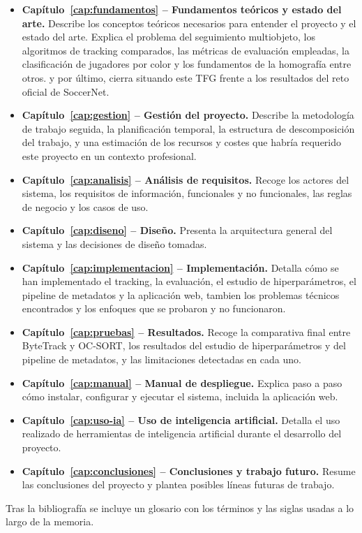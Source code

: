 \begin{itemize}
  \item \textbf{Capítulo~\ref{cap:fundamentos} -- Fundamentos teóricos y
        estado del arte.}
        Describe los conceptos teóricos necesarios para entender el
        proyecto y el estado del arte. Explica el problema del seguimiento multiobjeto, los algoritmos
        de tracking comparados, las métricas de evaluación empleadas, la
        clasificación de jugadores por color y los fundamentos de la
        homografía entre otros. y por último, cierra situando este TFG frente a los
        resultados del reto oficial de SoccerNet.
  \item \textbf{Capítulo~\ref{cap:gestion} -- Gestión del proyecto.}
        Describe la metodología de trabajo seguida, la planificación
        temporal, la estructura de descomposición del trabajo, y una
        estimación de los recursos y costes que habría requerido este
        proyecto en un contexto profesional.
  \item \textbf{Capítulo~\ref{cap:analisis} -- Análisis de requisitos.}
        Recoge los actores del sistema, los requisitos de información,
        funcionales y no funcionales, las reglas de negocio y los casos de
        uso.
  \item \textbf{Capítulo~\ref{cap:diseno} -- Diseño.}
        Presenta la arquitectura general del sistema y las decisiones de
        diseño tomadas.
  \item \textbf{Capítulo~\ref{cap:implementacion} -- Implementación.}
        Detalla cómo se han implementado el tracking, la evaluación, el
        estudio de hiperparámetros, el pipeline de metadatos y la
        aplicación web, tambien los problemas técnicos encontrados y los
        enfoques que se probaron y no funcionaron.
  \item \textbf{Capítulo~\ref{cap:pruebas} -- Resultados.}
        Recoge la comparativa final entre ByteTrack y OC-SORT, los
        resultados del estudio de hiperparámetros y del pipeline de
        metadatos, y las limitaciones detectadas en cada uno.
  \item \textbf{Capítulo~\ref{cap:manual} -- Manual de despliegue.}
        Explica paso a paso cómo instalar, configurar y ejecutar el
        sistema, incluida la aplicación web.
  \item \textbf{Capítulo~\ref{cap:uso-ia} -- Uso de inteligencia
        artificial.} Detalla el uso realizado de herramientas de
        inteligencia artificial durante el desarrollo del proyecto.
  \item \textbf{Capítulo~\ref{cap:conclusiones} -- Conclusiones y trabajo
        futuro.} Resume las
        conclusiones del proyecto y plantea posibles líneas futuras de
        trabajo.
\end{itemize}

Tras la bibliografía se incluye un glosario
con los términos y las siglas usadas a lo largo de la memoria.
